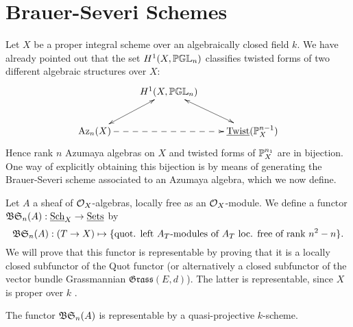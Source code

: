 \section{Brauer-Severi Schemes}
Let $X$ be a proper integral scheme over an algebraically closed field $k$.  We have already pointed out that the set $H^1(X,\mathbb{PGL}_n)$ classifies twisted forms of two different algebraic structures over $X$:
$$\xymatrix{
& \ar@{<->}[dl]H^1(X,\bbpgl_n) \ar@{<->}[dr]&\\
\Az_n(X)\ar@{-->}[rr] & & \twist(\bbp_X^{n-1})
}$$
Hence rank $n$ Azumaya algebras on $X$ and twisted forms of $\mathbb{P}^{n_1}_X$ are in bijection.  One way of explicitly obtaining this bijection is by means of generating the Brauer-Severi scheme associated to an Azumaya algebra, which we now define.

Let $A$ a sheaf of $\mathcal{O}_X$-algebras, locally free as an $\mathcal{O}_X$-module.  We define a functor $\mathfrak{BS}_n(A): \textnormal{\underline{Sch}}_X\rightarrow \textnormal{\underline{Sets}}$ by
$$\mathfrak{BS}_n(A): (T\rightarrow X)\mapsto \{\text{quot. left $A_T$-modules of $A_T$ loc. free of rank $n^2-n$}\}.$$
We will prove that this functor is representable by proving that it is a locally closed subfunctor of the Quot functor (or alternatively a closed subfunctor of the vector bundle Grassmannian $\mathfrak{Grass}(E,d)$).  The latter is representable, since $X$ is proper over $k$ \cite{nitsure2005construction}.
\begin{lem}
The functor $\mathfrak{BS}_n(A)$ is representable by a quasi-projective $k$-scheme.
\end{lem}
